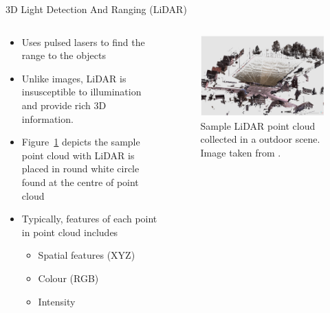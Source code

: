 \documentclass[aspectratio=169]{beamer}
\begin{document}
\begin{frame}{3D Light Detection And Ranging (LiDAR)}
    \begin{columns}
       \begin{column}{0.5\textwidth}
            \begin{itemize}
                \item Uses pulsed lasers to find the range to the objects
                \item Unlike images, LiDAR is insusceptible to illumination and provide rich 3D information.
                \item Figure~\ref{fig:sample_lidar_pc} depicts the sample point cloud with LiDAR is placed in round white circle found at the centre of point cloud
                \item Typically, features of each point in point cloud includes 
                \begin{itemize}
                    \item Spatial features (XYZ)
                    \item Colour (RGB)
                    \item Intensity
                \end{itemize}
            \end{itemize}
       \end{column}
       \begin{column}{0.5\textwidth}
            \begin{figure}
                \centering
                \includegraphics[scale=0.25]{images/sample_LiDAR_PC.jpg}
                \caption{Sample LiDAR point cloud collected in a outdoor scene. Image taken from \cite{hackel2017semantic3d}.}
                \label{fig:sample_lidar_pc}
            \end{figure}
       \end{column}
    \end{columns}
\end{frame}
\end{document}
